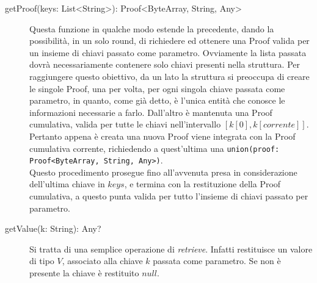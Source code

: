 \begin{description}
		\item[getProof(keys: List<String>): Proof<ByteArray, String, Any>] Questa funzione in qualche modo estende la precedente, dando la possibilità, in un solo round, di richiedere ed ottenere una Proof valida per un insieme di chiavi passato come parametro. Ovviamente la lista passata dovrà necessariamente contenere solo chiavi presenti nella struttura.
		Per raggiungere questo obiettivo, da un lato la struttura si preoccupa di creare le singole Proof, una per volta, per ogni singola chiave passata come parametro, in quanto, come già detto, è l'unica entità che conosce le informazioni necessarie a farlo. Dall'altro è mantenuta una Proof cumulativa, valida per tutte le chiavi nell'intervallo $ [k[0], k[corrente]] $. Pertanto appena è creata una nuova Proof viene integrata con la Proof cumulativa corrente, richiedendo a quest'ultima una \verb!union(proof: Proof<ByteArray, String, Any>)!. \\ Questo procedimento prosegue fino all'avvenuta presa in considerazione dell'ultima chiave in $ keys $, e termina con la restituzione della Proof cumulativa, a questo punta valida per tutto l'insieme di chiavi passato per parametro.
		
		\item[getValue(k: String): Any?] Si tratta di una semplice operazione di \textit{retrieve}. Infatti restituisce un valore di tipo $ V $, associato alla chiave $ k $ passata come parametro. Se non è presente la chiave è restituito $ null $.
		

\end{description}
